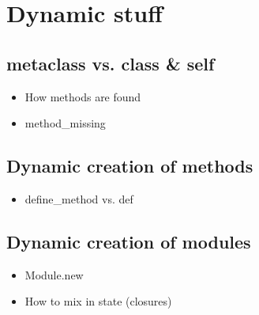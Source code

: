 \documentclass{article}
\begin{document}
\section{Dynamic stuff}

\subsection{metaclass vs. class \& self}
\begin{itemize}
  \item How methods are found
  \item method\_missing
\end{itemize}

\subsection{Dynamic creation of methods}
\begin{itemize}
  \item define\_method vs. def
\end{itemize}
\subsection{Dynamic creation of modules}
\begin{itemize}
  \item Module.new
  \item How to mix in state (closures)
\end{itemize}
\end{document}
